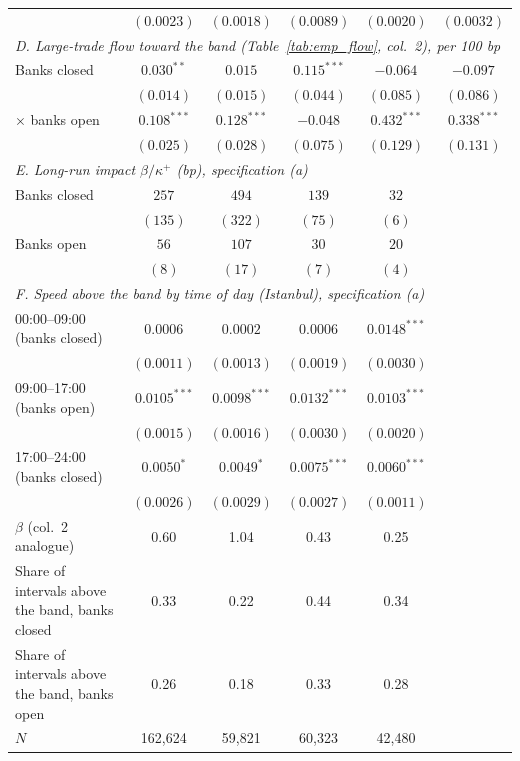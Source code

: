 \begin{tabular}{lccccc}
 & $(0.0023)$ & $(0.0018)$ & $(0.0089)$ & $(0.0020)$ & $(0.0032)$ \\
\multicolumn{6}{l}{\emph{D. Large-trade flow toward the band (Table~\ref{tab:emp_flow}, col.\ 2), per 100 bp}} \\
Banks closed & $0.030^{**}$ & $0.015$ & $0.115^{***}$ & $-0.064$ & $-0.097$ \\
 & $(0.014)$ & $(0.015)$ & $(0.044)$ & $(0.085)$ & $(0.086)$ \\
\quad$\times$ banks open & $0.108^{***}$ & $0.128^{***}$ & $-0.048$ & $0.432^{***}$ & $0.338^{***}$ \\
 & $(0.025)$ & $(0.028)$ & $(0.075)$ & $(0.129)$ & $(0.131)$ \\
\multicolumn{6}{l}{\emph{E. Long-run impact $\beta/\kappa^+$ (bp), specification (a)}} \\
Banks closed & $257$ & $494$ & $139$ & $32$ &  \\
 & $(135)$ & $(322)$ & $(75)$ & $(6)$ &  \\
Banks open & $56$ & $107$ & $30$ & $20$ &  \\
 & $(8)$ & $(17)$ & $(7)$ & $(4)$ &  \\
\multicolumn{6}{l}{\emph{F. Speed above the band by time of day (Istanbul), specification (a)}} \\
00:00--09:00 (banks closed) & $0.0006$ & $0.0002$ & $0.0006$ & $0.0148^{***}$ &  \\
 & $(0.0011)$ & $(0.0013)$ & $(0.0019)$ & $(0.0030)$ &  \\
09:00--17:00 (banks open) & $0.0105^{***}$ & $0.0098^{***}$ & $0.0132^{***}$ & $0.0103^{***}$ &  \\
 & $(0.0015)$ & $(0.0016)$ & $(0.0030)$ & $(0.0020)$ &  \\
17:00--24:00 (banks closed) & $0.0050^{*}$ & $0.0049^{*}$ & $0.0075^{***}$ & $0.0060^{***}$ &  \\
 & $(0.0026)$ & $(0.0029)$ & $(0.0027)$ & $(0.0011)$ &  \\
\midrule
$\beta$ (col.\ 2 analogue) & 0.60 & 1.04 & 0.43 & 0.25 & \\
Share of intervals above the band, banks closed & 0.33 & 0.22 & 0.44 & 0.34 & \\
Share of intervals above the band, banks open & 0.26 & 0.18 & 0.33 & 0.28 & \\
$N$ & 162,624 & 59,821 & 60,323 & 42,480 & \\
\bottomrule
\end{tabular}
